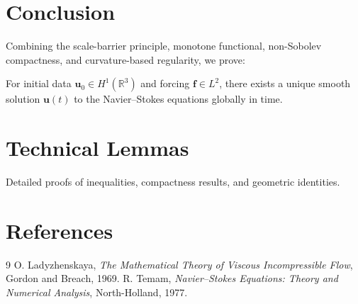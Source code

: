 \section{Conclusion}
Combining the scale-barrier principle, monotone functional, non-Sobolev compactness, and curvature-based regularity, we prove:
\begin{theorem}
For initial data \(\mathbf{u}_0 \in H^1(\mathbb{R}^3)\) and forcing \(\mathbf{f} \in L^2\), there exists a unique smooth solution \(\mathbf{u}(t)\) to the Navier--Stokes equations globally in time.
\end{theorem}

\appendix
\section{Technical Lemmas}
Detailed proofs of inequalities, compactness results, and geometric identities.

\section{References}
\begin{thebibliography}{9}
 O. Ladyzhenskaya, \emph{The Mathematical Theory of Viscous Incompressible Flow}, Gordon and Breach, 1969.
 R. Temam, \emph{Navier--Stokes Equations: Theory and Numerical Analysis}, North-Holland, 1977.
\end{thebibliography}

